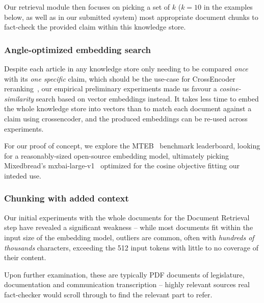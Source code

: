 Our retrieval module then focuses on picking a set of $k$ ($k=10$ in the examples below, as well as in our submitted system) most appropriate document chunks to fact-check the provided claim within this knowledge store.

\subsubsection{Angle-optimized embedding search}
\label{sec:knn}
Despite each article in any knowledge store only needing to be compared \textit{once} with its \textit{one specific} claim, which should be the use-case for CrossEncoder reranking~\cite{dejean2024thoroughcomparisoncrossencodersllms}, our empirical preliminary experiments made us favour a \textit{cosine-similarity} search based on vector embeddings instead.
It takes less time to embed the whole knowledge store into vectors than to match each document against a claim using crossencoder, and the produced embeddings can be re-used across experiments.

For our proof of concept, we explore the MTEB~\cite{muennighoff-etal-2023-mteb} benchmark leaderboard, looking for a reasonably-sized open-source embedding model, ultimately picking Mixedbread's mxbai-large-v1~\cite{li-li-2024-aoe,emb2024mxbai} optimized for the cosine objective fitting our inteded use.


\subsubsection{Chunking with added context}
Our initial experiments with the whole \averitec{}  documents for the Document Retrieval step have revealed a significant weakness -- while most documents fit within the input size of the embedding model, outliers are common, often with \textit{hundreds of thousands} characters, exceeding the 512 input tokens with little to no coverage of their content.

Upon further examination, these are typically PDF documents of legislature, documentation and communication transcription -- highly relevant sources real fact-checker would scroll through to find the relevant part to refer. 

